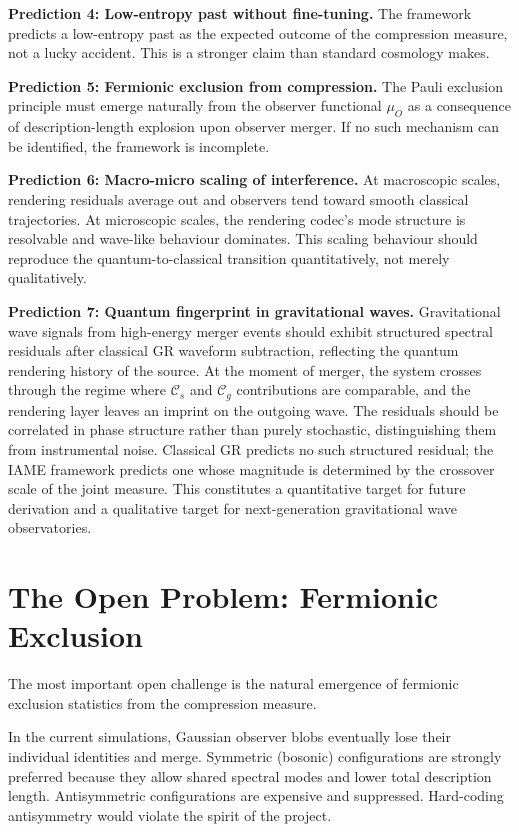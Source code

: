 \documentclass[12pt,a4paper]{article}
\newcommand{\iame}{\textsc{IAME}}
\newcommand{\Cs}{\mathcal{C}_s}
\newcommand{\Cg}{\mathcal{C}_g}
\newcommand{\muO}{\mu_O}
\begin{document}
\textbf{Prediction 4: Low-entropy past without fine-tuning.}
The framework predicts a low-entropy past as the expected outcome of the
compression measure, not a lucky accident. This is a stronger claim than
standard cosmology makes.

\textbf{Prediction 5: Fermionic exclusion from compression.}
The Pauli exclusion principle must emerge naturally from the observer
functional $\muO$ as a consequence of description-length explosion upon
observer merger. If no such mechanism can be identified, the framework is
incomplete.

\textbf{Prediction 6: Macro-micro scaling of interference.}
At macroscopic scales, rendering residuals average out and observers tend
toward smooth classical trajectories. At microscopic scales, the rendering
codec's mode structure is resolvable and wave-like behaviour dominates. This
scaling behaviour should reproduce the quantum-to-classical transition
quantitatively, not merely qualitatively.

\textbf{Prediction 7: Quantum fingerprint in gravitational waves.}
Gravitational wave signals from high-energy merger events should exhibit
structured spectral residuals after classical GR waveform subtraction,
reflecting the quantum rendering history of the source. At the moment of
merger, the system crosses through the regime where $\Cs$ and $\Cg$
contributions are comparable, and the rendering layer leaves an imprint on
the outgoing wave. The residuals should be correlated in phase structure
rather than purely stochastic, distinguishing them from instrumental noise.
Classical GR predicts no such structured residual; the \iame{} framework
predicts one whose magnitude is determined by the crossover scale of the joint
measure. This constitutes a quantitative target for future derivation and a
qualitative target for next-generation gravitational wave observatories.

\section{The Open Problem: Fermionic Exclusion}
\label{sec:open}

The most important open challenge is the natural emergence of fermionic
exclusion statistics from the compression measure.

In the current simulations, Gaussian observer blobs eventually lose their
individual identities and merge. Symmetric (bosonic) configurations are
strongly preferred because they allow shared spectral modes and lower total
description length. Antisymmetric configurations are expensive and suppressed.
Hard-coding antisymmetry would violate the spirit of the project.
\end{document}
